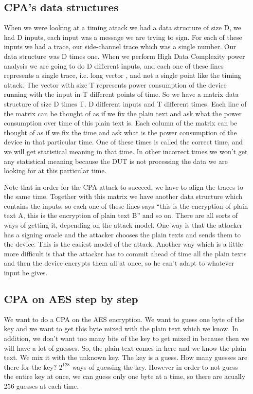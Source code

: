 \subsection{CPA's data structures}\label{c8_CPA_data_structures:subsec}

When we were looking at a timing attack we had a data structure of size D, we
had D inputs, each input was a message we are trying to sign. For each of these
inputs we had a trace, our side-channel trace which was a single number.
Our data structure was D times one. When we perform High Data Complexity power
analysis we are going to do D different inputs, and each one of these lines
represents a single trace, i.e. long vector , and not a single point like the
timing attack. The vector with size T represents power consumption of the device
running with the input in T different points of time. So we have a matrix data
structure of size D times T. D different inputs and T different times. Each line
of the matrix can be thought of as if we fix the plain text and ask what the power
consumption over time of this plain text is. 
Each column of the matrix can be thought of as if we fix the time and ask what is the
power consumption of the device in that particular time. One of these times is
called the correct time, and we will get statistical meaning in that time. In
other incorrect times we won't get any statistical meaning because the DUT is
not processing the data we are looking for at this particular time.

Note that in order for the CPA attack to succeed, we have to align the traces to
the same time. Together with this matrix we have another data structure which contains
the inputs, so each one of these lines says “this is the encryption of plain
text A, this is the encryption of plain text B” and so on. There are all sorts of
ways of getting it, depending on the attack model. One way is that the attacker
has a signing oracle and the attacker chooses the plain texts and sends them to
the device. This is the easiest model of the attack. Another way which is a
little more difficult is that the attacker has to commit ahead of time all the
plain texts and then the device encrypts them all at once, so he can't adapt to
whatever input he gives.

\subsection{CPA on AES step by step}\label{c8_CPA_overview:subsec}

We want to do a CPA on the AES encryption. We want to guess one byte of the key
and we want to get this byte mixed with the plain text which we know. In addition, we
don't want too many bits of the key to get mixed in because then we will have a
lot of guesses. So, the plain text comes in here and we know the plain text. We
mix it with the unknown key. The key is a guess. How many guesses are there for
the key?  $2^{128}$ ways of guessing the key. However in order to not guess the
entire key at once, we can guess only one byte at a time, so there are acually
256 guesses at each time. 

